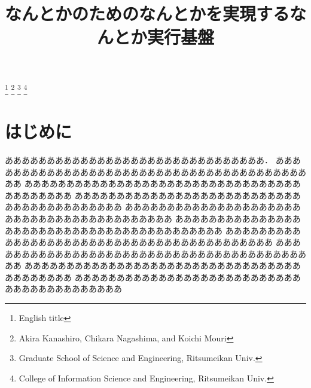 \documentclass[a4paper,10pt,twocolumn]{jarticle}
\title{なんとかのためのなんとかを実現するなんとか実行基盤}
\author{%
\hspace*{2zw}金城 聖 \da\hfill %
永島 力\da\da\hfill %
毛利 公一\da\da \\ %
\hspace*{1zw}
\da 立命館大学大学院理工学研究科\hskip \Cwd %
\da\da 立命館大学情報理工学部 %
}
\begin{document}
\setlength{\baselineskip}{13.39pt}   %
\ipsjtitle

\footnote{%
	\hspace{-4mm}
	English title
}
\footnote{%
	\hspace{-4mm}
	Akira Kanashiro\da, Chikara Nagashima\da, and Koichi Mouri\da\da
}
\footnote{%
	\hspace{-4mm}
	\da Graduate School of Science and Engineering, Ritsumeikan Univ.
}
\footnote{%
	\hspace{-5mm}
	\da\da College of Information Science and Engineering, Ritsumeikan Univ.
}

\vspace*{-\baselineskip}

\section{はじめに} \label{first}
あああああああああああああああああああああああああああああああ\cite{trace}．
あああああああああああああああああああああああああああああああああああああああああ
あああああああああああああああああああああああああああああああああああああああああ
あああああああああああああああああああああああああああああああああああああああああ
あああああああああああああああああああああああああああああああああああああああああ
あああああああああああああああああああああああああああああああああああああああああ
あああああああああああああああああああああああああああああああああああああああああ
あああああああああああああああああああああああああああああああああああああああああ
あああああああああああああああああああああああああああああああああああああああああ
あああああああああああああああああああああああああああああああああああああああああ
\end{document}
